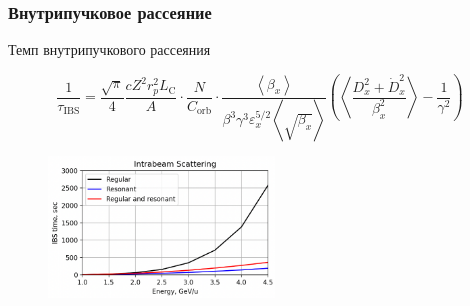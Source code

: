 \begin{frame}
	\frametitle{Внутрипучковое рассеяние}
\begin{center}
Темп внутрипучкового рассеяния	
\end{center}

\small \begin{equation}
\frac{1}{\tau_{\text{IBS}}}=\frac{\sqrt{\pi}}{4} \frac{c Z^2 r_p^2 L_{\text{C}}}{A} \cdot \frac{N}{C_{\text{orb}}} \cdot \frac{\left\langle\beta_x\right\rangle}{\beta^3 \gamma^3 \varepsilon_x^{5 / 2}\left\langle\sqrt{\beta_x}\right\rangle}\left(\left\langle\frac{D_x^2+\dot{D}_x^2}{\beta_x^2}\right\rangle-\frac{1}{\gamma^2}\right)
\end{equation} \normalsize

            \begin{figure}[h!]
                \centering
                \includegraphics[width=6cm]{images/IBS}
                \label{fig:ibs}
            \end{figure}
	
\end{frame}